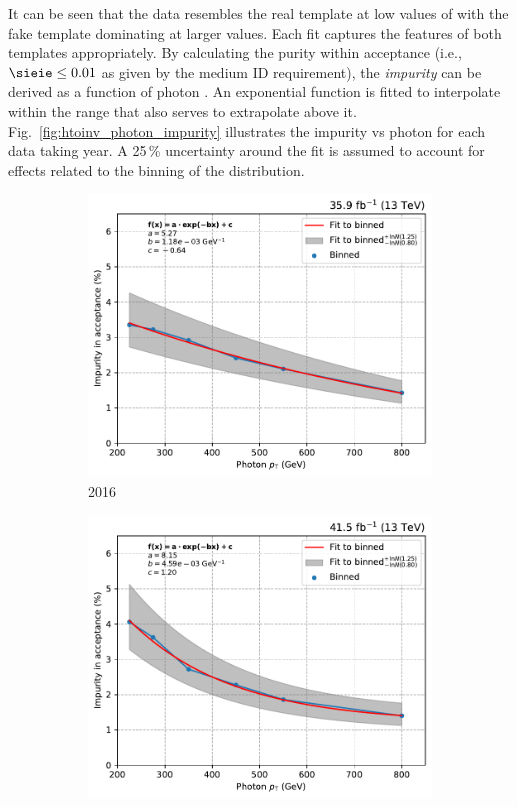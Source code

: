 It can be seen that the data resembles the real template at low values of \sieie with the fake template dominating at larger values. Each fit captures the features of both templates appropriately. By calculating the purity within acceptance (i.e., $\sieie \leq \text{0.01}$ as given by the medium ID requirement), the \emph{impurity} can be derived as a function of photon \pt. An exponential function is fitted to interpolate within the range that also serves to extrapolate above it. Fig.~\ref{fig:htoinv_photon_impurity} illustrates the impurity vs photon \pt for each data taking year. A 25\,\% uncertainty around the fit is assumed to account for effects related to the binning of the \sieie distribution.

\begin{figure}[htbp]
    \centering
    \begin{subfigure}[b]{0.32\textwidth}
        \includegraphics[width=\textwidth]{figures/photon_purity/2016/impurity_plot_2016.pdf}
        \caption{2016}
    \end{subfigure}
    \hfill
    \begin{subfigure}[b]{0.32\textwidth}
        \includegraphics[width=\textwidth]{figures/photon_purity/2017/impurity_plot_2017.pdf}

\end{subfigure}
\end{figure}
